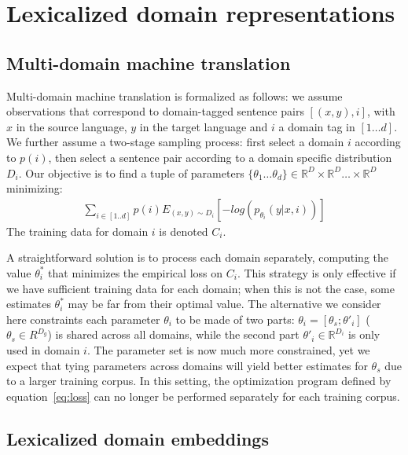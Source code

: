 \documentclass[a4paper]{article}
\newcommand{\fyDone}[1]{\done[FY]\Todo[FY:]{\textcolor{orange}{#1}}}
\begin{document}
\section{Lexicalized domain representations\label{sec:lexicalized_embeddings}}

\subsection{Multi-domain machine translation \label{ssec:statement}}

Multi-domain machine translation is formalized as follows: we assume observations that correspond to  domain-tagged sentence pairs $[(x,y),i]$, with $x$ in the source language, $y$ in the target language and $i$ a domain tag in $[1\dots d]$. We further assume a two-stage sampling process: first select a domain $i$ according to $p(i)$, then select a sentence pair according to a domain specific distribution $D_i$. Our objective is to find a tuple of parameters $\{\theta_1 \dots \theta_d \} \in \mathbb{R}^D \times \mathbb{R}^D \dots \times \mathbb{R}^D$ minimizing:
\begin{equation} \label{eq:loss}
\begin{split}
\sum_{i \in [1..d]} p(i) E_{(x,y) \sim D_{i}} [-log(p_{\theta_i}(y|x,i))]
\end{split}
\end{equation}
The training data for domain $i$ is denoted $C_i$.

A straightforward solution is to process each domain separately, computing the value $\theta_i^*$ that minimizes the empirical loss on $C_i$. This strategy is only effective if we have sufficient training data for each domain; when this is not the case, some estimates $\theta_i^*$ may be far from their optimal value. \fyDone{Risk}
The alternative we consider here constraints each parameter $\theta_i$ to be made of two parts: $\theta_i = [\theta_s; \theta'_i]$ ($\theta_s \in R^{D_g}$) is shared across all domains, while the second part $\theta'_i \in \mathbb{R}^{D_i}$ is only used in domain $i$.
The parameter set is now much more constrained, yet we expect that tying parameters across domains will yield better estimates for $\theta_s$ due to a larger training corpus. In this setting, the optimization program defined by equation~\eqref{eq:loss} can no longer be performed separately for each training corpus.

\subsection{Lexicalized domain embeddings \label{ssec:lde}}
\end{document}
